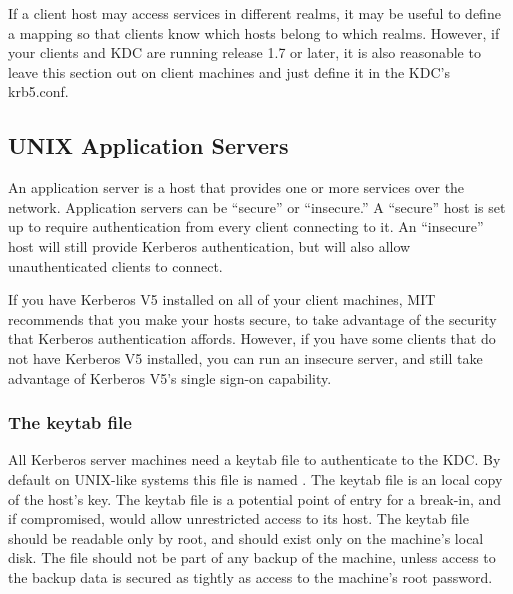 \documentclass[letterpaper,10pt,english]{sphinxmanual}
\begin{document}
If a client host may access services in different realms, it may be
useful to define a {\hyperref[\detokenize{admin/conf_files/krb5_conf:domain-realm}]{}} mapping so that clients know
which hosts belong to which realms.  However, if your clients and KDC
are running release 1.7 or later, it is also reasonable to leave this
section out on client machines and just define it in the KDC’s
krb5.conf.


\subsection{UNIX Application Servers}
\label{\detokenize{admin/install_appl_srv:unix-application-servers}}\label{\detokenize{admin/install_appl_srv::doc}}
An application server is a host that provides one or more services
over the network.  Application servers can be “secure” or “insecure.”
A “secure” host is set up to require authentication from every client
connecting to it.  An “insecure” host will still provide Kerberos
authentication, but will also allow unauthenticated clients to
connect.

If you have Kerberos V5 installed on all of your client machines, MIT
recommends that you make your hosts secure, to take advantage of the
security that Kerberos authentication affords.  However, if you have
some clients that do not have Kerberos V5 installed, you can run an
insecure server, and still take advantage of Kerberos V5’s single
sign-on capability.


\subsubsection{The keytab file}
\label{\detokenize{admin/install_appl_srv:the-keytab-file}}\label{\detokenize{admin/install_appl_srv:keytab-file}}
All Kerberos server machines need a keytab file to authenticate to the
KDC.  By default on UNIX-like systems this file is named {\hyperref[\detokenize{mitK5defaults:paths}]{}}.
The keytab file is an local copy of the host’s key.  The keytab file
is a potential point of entry for a break-in, and if compromised,
would allow unrestricted access to its host.  The keytab file should
be readable only by root, and should exist only on the machine’s local
disk.  The file should not be part of any backup of the machine,
unless access to the backup data is secured as tightly as access to
the machine’s root password.
\end{document}

